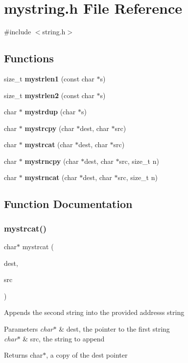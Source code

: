 \section{mystring.\+h File Reference}
\label{mystring_8h}
{\ttfamily \#include $<$string.\+h$>$}\newline
\subsection*{Functions}
\begin{DoxyCompactItemize}
\item 
size\+\_\+t \textbf{ mystrlen1} (const char $\ast$s)
\item 
size\+\_\+t \textbf{ mystrlen2} (const char $\ast$s)
\item 
char $\ast$ \textbf{ mystrdup} (char $\ast$s)
\item 
char $\ast$ \textbf{ mystrcpy} (char $\ast$dest, char $\ast$src)
\item 
char $\ast$ \textbf{ mystrcat} (char $\ast$dest, char $\ast$src)
\item 
char $\ast$ \textbf{ mystrncpy} (char $\ast$dest, char $\ast$src, size\+\_\+t n)
\item 
char $\ast$ \textbf{ mystrncat} (char $\ast$dest, char $\ast$src, size\+\_\+t n)
\end{DoxyCompactItemize}


\subsection{Function Documentation}
\mbox{\label{mystring_8h_a68e51a014c7210b524d657b665d09db8}} 
\subsubsection{mystrcat()}
{\footnotesize\ttfamily char$\ast$ mystrcat (\begin{DoxyParamCaption}\item[{char $\ast$}]{dest,  }\item[{char $\ast$}]{src }\end{DoxyParamCaption})}

Appends the second string into the provided address\textquotesingle{}s string 
\begin{DoxyParams}{Parameters}
{\em char$\ast$} & dest, the pointer to the first string \\
\hline
{\em char$\ast$} & src, the string to append \\
\hline
\end{DoxyParams}
\begin{DoxyReturn}{Returns}
char$\ast$, a copy of the dest pointer 
\end{DoxyReturn}


